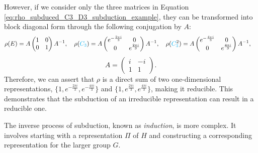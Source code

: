 \begin{example}
However, if we consider only the three matrices in Equation \ref{eq:rho_subduced_C3_D3_subduction_example}, they can be transformed into block diagonal form through the following conjugation by \(A\):
\begin{equation} \label{eq:subduction_can_be_reducible_example}
\rho(E) =
A
\begin{pmatrix}
1 & 0 \\
0 & 1
\end{pmatrix}
A^{-1},
\quad
\rho(\Ct) =
A
\begin{pmatrix}
e^{-\frac{2\pi i}{3}} & 0 \\
0 & e^{\frac{2\pi i}{3}}
\end{pmatrix}
A^{-1},
\quad
\rho(\Ctn{2}) =
A
\begin{pmatrix}
e^{-\frac{4\pi i}{3}} & 0 \\
0 & e^{\frac{4\pi i}{3}}
\end{pmatrix}
A^{-1},
\quad
\end{equation}
\begin{equation} \label{eq:A_matrix_that_diagonalizes}
A =
\begin{pmatrix}
i & -i \\
1 & 1
\end{pmatrix}.
\end{equation}
Therefore, we can assert that \(\rho\) is a direct sum of two one-dimensional representations, \(\{1, e^{-\frac{2\pi i}{3}}, e^{-\frac{4\pi i}{3}}\}\) and \(\{1, e^{\frac{2\pi i}{3}}, e^{\frac{4\pi i}{3}}\}\), making it reducible. This demonstrates that the subduction of an irreducible representation can result in a reducible one.

\end{example}

The inverse process of subduction, known as \textit{induction}, is more complex. It involves starting with a representation \(\Pi\) of \(H\) and constructing a corresponding representation for the larger group \(G\).

